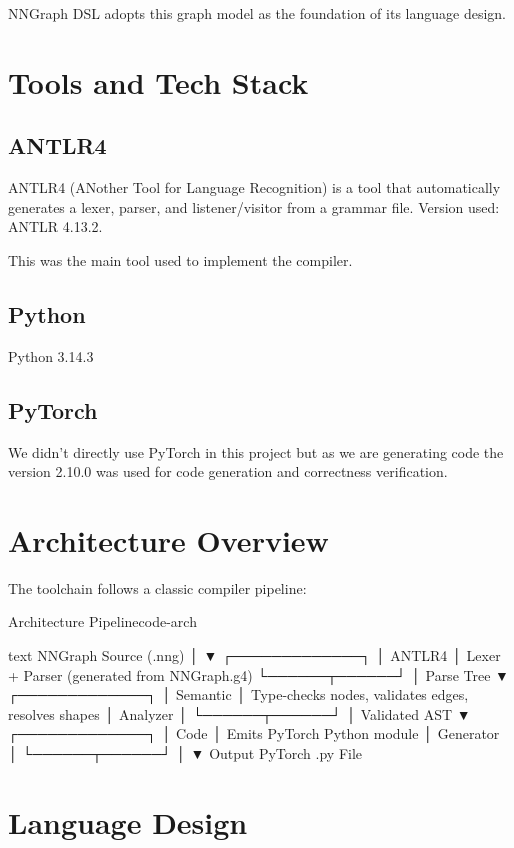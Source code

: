 \documentclass{nngraph-en}
\begin{document}
NNGraph DSL adopts this graph model as the foundation of its language design.

\chapter{Tools and Tech Stack}

\section{ANTLR4}
ANTLR4 (ANother Tool for Language Recognition) is a tool that automatically generates a lexer, parser, and listener/visitor from a  grammar file. Version used: ANTLR 4.13.2.

This was the main tool used to implement the compiler.

\section{Python}

Python 3.14.3

\section{PyTorch}
We didn't directly use PyTorch in this project but as we are generating code the version 2.10.0 was used for code generation and correctness verification.

\chapter{Architecture Overview}

The toolchain follows a classic compiler pipeline:

\begin{codebox}{Architecture Pipeline}{code-arch}
\begin{amzcode}[fontsize=\scriptsize]{text}
NNGraph Source (.nng)
        │
        ▼
┌─────────────┐
│   ANTLR4    │  Lexer + Parser (generated from NNGraph.g4)
└──────┬──────┘
       │ Parse Tree
       ▼
┌─────────────┐
│  Semantic   │  Type-checks nodes, validates edges, resolves shapes
│  Analyzer   │
└──────┬──────┘
       │ Validated AST
       ▼
┌─────────────┐
│    Code     │  Emits PyTorch Python module
│  Generator  │
└──────┬──────┘
       │
       ▼
Output PyTorch .py File
\end{amzcode}
\end{codebox}

\chapter{Language Design}
\end{document}
